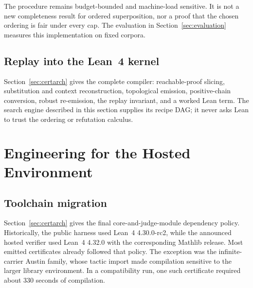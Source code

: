 \documentclass[10pt,twocolumn]{article}
\newcommand{\lean}{Lean~4\xspace}
\begin{document}
The procedure remains budget-bounded and machine-load sensitive.  It is not a
new completeness result for ordered superposition, nor a proof that the chosen
ordering is fair under every cap.  The evaluation in
Section~\ref{sec:evaluation} measures this implementation on fixed corpora.

\subsection{Replay into the \lean kernel}

Section~\ref{sec:certarch} gives the complete compiler: reachable-proof
slicing, substitution and context reconstruction, topological emission,
positive-chain conversion, robust re-emission, the replay invariant, and a
worked Lean term.  The search engine described in this section supplies its
recipe DAG; it never asks Lean to trust the ordering or refutation calculus.

\section{Engineering for the Hosted Environment}
\label{sec:hosted}

\subsection{Toolchain migration}
\label{sec:leanmigration}

Section~\ref{sec:certarch} gives the final core-and-judge-module dependency
policy.  Historically, the public harness used \lean 4.30.0-rc2, while the
announced hosted verifier used \lean 4.32.0 with the corresponding Mathlib
release.  Most emitted certificates already followed that policy.  The
exception was the infinite-carrier Austin family, whose tactic import made
compilation sensitive to the larger library environment.  In a compatibility
run, one such certificate required about 330 seconds of compilation.
\end{document}
